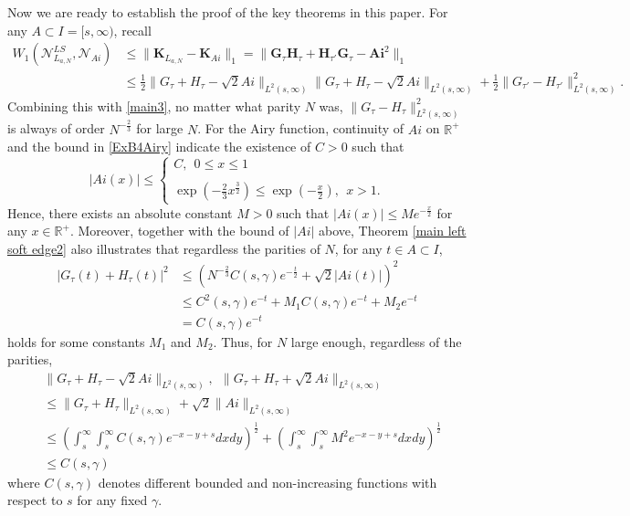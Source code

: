 \documentclass[11pt]{article}
\numberwithin{equation}{section}%
\numberwithin{theorem}{section}
\begin{document}
Now we are ready to establish the proof of the key theorems in this paper.
\medbreak{}\enspace
For any $A\subset I=[s,\infty)$, recall
\begin{equation*}
    \begin{split}
W_1\left(\mathcal{N}_{L_{a,N}}^{LS},\mathcal{N}_{Ai}\right)&\le\|\mathbf{K}_{L_{a,N}}-\mathbf{K}_{Ai}\|_1=\|\mathbf{G}_{\tau}\mathbf{H}_{\tau}+\mathbf{H}_{\tau'}\mathbf{G}_{\tau}-\mathbf{Ai}^2\|_1\\
        &\le\frac{1}{2}\|G_{\tau}+H_{\tau}-\sqrt2 Ai\|_{L^2(s,\infty)}\|G_{\tau}+H_{\tau}-\sqrt2 Ai\|_{L^2(s,\infty)}+\frac{1}{2}\|G_{\tau'}-H_{\tau'}\|^2_{L^2(s,\infty)}.
    \end{split}
\end{equation*}
Combining this with \eqref{main3}, no matter what parity $N$ was, $\|G_{\tau}-H_{\tau}\|^2_{L^2(s,\infty)}$ is always of order $N^{-\frac{2}{3}}$ for large $N$. For the Airy function, continuity of $Ai$ on $\mathbb{R}^+$ and the bound in \eqref{ExB4Airy} indicate the existence of $C>0$ such that
\begin{equation*}
    |Ai(x)|\le\left\{\begin{array}{cc}
      C,~~0\le x\le1\\
      \\
      \exp\left(-\frac{2}{3}x^\frac{3}{2}\right)\le\exp\left(-\frac{x}{2}\right),~~x>1.
    \end{array}\right.
\end{equation*}
Hence, there exists an absolute constant $M>0$ such that $|Ai(x)|\le Me^{-\frac{x}{2}}$ for any $x\in\mathbb{R}^+$. Moreover, together with the bound of $|Ai|$ above, Theorem \ref{main left soft edge2} also illustrates that regardless the parities of $N$, for any $t\in A\subset I$,
\begin{equation*}
\begin{split}
      \left|G_{\tau}(t)+H_{\tau}(t)\right|^2&\le\left(N^{-\frac{2}{3}}C(s,\gamma)e^{-\frac{t}{2}}+\sqrt2|Ai(t)|\right)^2\\&\le C^2(s,\gamma)e^{-t}+M_1 C(s,\gamma)e^{-t}+M_2e^{-t}\\&=C(s,\gamma)e^{-t}
\end{split}
\end{equation*}
holds for some constants $M_1$ and $M_2$. Thus, for $N$ large enough, regardless of the parities,
\begin{equation}\label{boundpartofdif}
    \begin{split}
        &\|G_{\tau}+H_{\tau}-\sqrt2Ai\|_{L^2(s,\infty)},~~\|G_{\tau}+H_{\tau}+\sqrt2Ai\|_{L^2(s,\infty)}\\&\le\|G_{\tau}+H_{\tau}\|_{L^2(s,\infty)}+\sqrt2\|Ai\|_{L^2(s,\infty)}\\
        &\le\left(\int_{s}^\infty\int_{s}^\infty C(s,\gamma)e^{-x-y+s}dxdy\right)^\frac{1}{2}+\left(\int_{s}^\infty\int_{s}^\infty M^2e^{-x-y+s}dxdy\right)^\frac{1}{2}\\&\le C(s,\gamma)
    \end{split}
\end{equation}
where $C(s,\gamma)$ denotes different bounded and non-increasing functions with respect to $s$ for any fixed $\gamma$.
\end{document}
